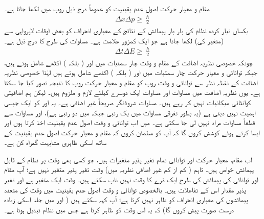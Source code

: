 مقام و معیار حرکت اصول عدم یقینیت کو عموماً درج ذیل روپ میں لکھا جاتا ہے۔
\begin{align}\label{مساوات_قواعد_اصول_مقام_و_معیار_حرکت_عدم_یقینیت}
\Delta x \Delta p \geq \frac{\hslash}{2} 
\end{align}
یکساں تیار کردہ نظام کی بار بار پیمائش کے نتائج کے معیاری انحراف کو بعض اوقات لاپرواہی سے  (متغیر  کی) لکھا جاتا ہے جو ایک کمزور علامت ہے۔ مساوات  کی طرح کا  درج ذیل ہے۔
\begin{align}\label{مساوات_قواعد_اصول_وقت_و_توانائی_عدم_یقینیت}
\Delta t \Delta E \geq \frac{\hslash}{2}
\end{align}
چونکہ خصوصی نظریہ اضافت کے  مقام و وقت چار سمتیات میں  اور  ( بلکہ ) اکٹھے شامل ہوتے ہیں، جبکہ توانائی و معیار حرکت چار سمتیات میں  اور  ( بلکہ ) اکٹھے شامل ہوتے ہیں لہٰذا خصوصی نظریہ اضافت کے نقطہ نظر سے توانائی و وقت روپ کو مقام و معیار حرکت روپ کا نتیجہ تصور کیا جا سکتا ہے۔ یوں نظریہ اضافت میں مساوات  اور مساوات  ایک دوسرے کیلئے لازم و ملزوم ہیں۔ لیکن ہم اضافیتی کوانٹائی میکانیات نہیں کر رہے ہیں۔ مساوات شروڈنگر صریحاً غیر اضافی ہے۔ یہ  اور  کو ایک جیسی اہمیت نہیں دیتی ہے (یہ بطور تفرقی مساوات  میں یک رتبی جبکہ  میں دو رتبی ہے)، اور
 مساوات  سے قطعاً مساوات  مراد نہیں لی جا سکتی ہے۔ میں اب توانائی و وقت اصول عدم یقینیت اخذ کرتا ہوں اور ایسا کرتے ہوئے کوشش کروں گا کہ آپ کو مطمئن کروں کہ مقام و معیار حرکت اصول عدم یقینیت کے ساتھ اسکی ظاہری مشابہت گمراہ کن ہے۔
 
اب مقام، معیار حرکت اور توانائی تمام تغیر پذیر متغیرات ہیں، جو کسی بھی وقت پر نظام کے قابل پیمائش خواص ہیں۔ تاہم ( کم از کم غیر اضافی نظریہ میں) وقت تغیر پذیر متغیر نہیں ہے؛ آپ مقام اور توانائی کی پیمائش کی طرح ایک ذرے کا وقت نہیں ناپ سکتے ہیں۔ وقت ایک  متغیر ہے اور تغیر پذیر مقدار اس کے تفاعلات ہیں۔ بالخصوص توانائی و وقت اصول عدم یقینیت میں وقت کی متعدد پیمائشوں کی معیاری انحراف کو  ظاہر نہیں کرتا ہے؛ آپ کہہ سکتے ہیں ( اور میں جلد اسکی زیادہ درست صورت پیش کروں گا) کہ یہ اس وقت کو ظاہر کرتا ہے جس میں نظام تبدیل ہوتا ہے۔

